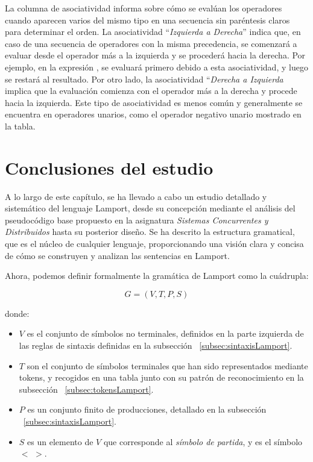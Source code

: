 \vspace{0.5cm}

La columna de asociatividad informa sobre cómo se evalúan los operadores cuando aparecen varios del mismo tipo en una secuencia sin paréntesis claros para determinar el orden. La asociatividad ``\textit{Izquierda a Derecha}'' indica que, en caso de una secuencia de operadores con la misma precedencia, se comenzará a evaluar desde el operador más a la izquierda y se procederá hacia la derecha. Por ejemplo, en la expresión , se evaluará primero  debido a esta asociatividad, y luego se restará  al resultado. Por otro lado, la asociatividad ``\textit{Derecha a Izquierda} implica que la evaluación comienza con el operador más a la derecha y procede hacia la izquierda. Este tipo de asociatividad es menos común y generalmente se encuentra en operadores unarios, como el operador negativo unario mostrado en la tabla.

\section{Conclusiones del estudio}
A lo largo de este capítulo, se ha llevado a cabo un estudio detallado y sistemático del lenguaje Lamport, desde su concepción mediante el análisis del pseudocódigo base propuesto en la asignatura \textit{Sistemas Concurrentes y Distribuidos} hasta su posterior diseño. Se ha descrito la estructura gramatical, que es el núcleo de cualquier lenguaje, proporcionando una visión clara y concisa de cómo se construyen y analizan las sentencias en Lamport.

\vspace{0.5cm}
\noindent
Ahora, podemos definir formalmente la gramática de Lamport como la cuádrupla:

$$
G = (V,T,P,S)
$$

\noindent
donde:

\begin{itemize}
    \item $V$ es el conjunto de símbolos no terminales, definidos en la parte izquierda de las reglas de sintaxis definidas en la subsección ~\ref{subsec:sintaxisLamport}.
    \item $T$ son el conjunto de símbolos terminales que han sido representados mediante tokens, y recogidos en una tabla junto con su patrón de reconocimiento en la subsección ~\ref{subsec:tokensLamport}.
    \item $P$ es un conjunto finito de producciones, detallado en la subsección ~\ref{subsec:sintaxisLamport}.
    \item $S$ es un elemento de $V$ que corresponde al \textit{símbolo de partida}, y es el símbolo \hspace{0.5cm} $<$  $>$.
\end{itemize}

